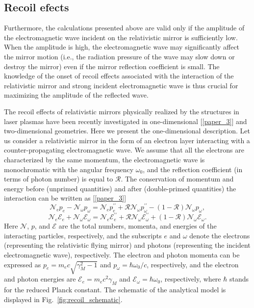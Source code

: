 \documentclass[10pt, a4paper, twoside, openright]{report}
\begin{document}
\subsection{Recoil efects}

Furthermore, the calculations presented above are valid only if the amplitude of the electromagnetic wave incident on the relativistic mirror is sufficiently low. When the amplitude is high, the electromagnetic wave may significantly affect the mirror motion (i.e., the radiation pressure of the wave may slow down or destroy the mirror) even if the mirror reflection coefficient is small. The knowledge of the onset of recoil effects associated with the interaction of the relativistic mirror and strong incident electromagnetic wave is thus crucial for maximizing the amplitude of the reflected wave.

The recoil effects of relativistic mirrors physically realized by the structures in laser plasmas have been recently investigated in one-dimensional [\ref{paper_3}] and two-dimensional \cite{Jeong2021} geometries. Here we present the one-dimensional description. Let us consider a relativistic mirror in the form of an electron layer interacting with a counter-propagating electromagnetic wave. We assume that all the electrons are characterized by the same momentum, the electromagnetic wave is monochromatic with the angular frequency $ \omega_0 $, and the reflection coefficient (in terms of photon number) is equal to $ \mathcal{R} $. The conservation of momentum and energy before (unprimed quantities) and after (double-primed quantities) the interaction can be written as [\ref{paper_3}]
\begin{equation}\label{eq:conservation_of_momentum}
\mathcal{N}_e p_e - \mathcal{N}_{\omega} p_{\omega} = \mathcal{N}_e p_e^{\prime \prime} + \mathcal{R} \mathcal{N}_{\omega} p_{\omega}^{\prime \prime} - \left( 1 - \mathcal{R} \right) \mathcal{N}_{\omega} p_{\omega},
\end{equation}
\begin{equation}\label{eq:conservation_of_energy}
\mathcal{N}_e \mathcal{E}_e + \mathcal{N}_{\omega} \mathcal{E}_{\omega} = \mathcal{N}_e \mathcal{E}_e^{\prime \prime} + \mathcal{R} \mathcal{N}_{\omega} \mathcal{E}_{\omega}^{\prime \prime} + \left( 1 - \mathcal{R} \right) \mathcal{N}_{\omega}  \mathcal{E}_{\omega}.
\end{equation}
Here $ \mathcal{N} $, $ p $, and $ \mathcal{E} $ are the total numbers, momenta, and energies of the interacting particles, respectively, and the subscripts $ e $ and $ \omega $ denote the electrons (representing the relativistic flying mirror) and photons (representing the incident electromagnetic wave), respectively. The electron and photon momenta can be expressed as $ p_e = m_e c \sqrt{\gamma_M^2 - 1} $ and $ p_{\omega} = \hbar \omega_0 / c $, respectively, and the electron and photon energies are $ \mathcal{E}_e = m_e c^2 \gamma_M $ and $ \mathcal{E}_{\omega} = \hbar \omega_0 $, respectively, where $ \hbar $ stands for the reduced Planck constant. The schematic of the analytical model is displayed in Fig.~\ref{fig:recoil_schematic}.
\end{document}
